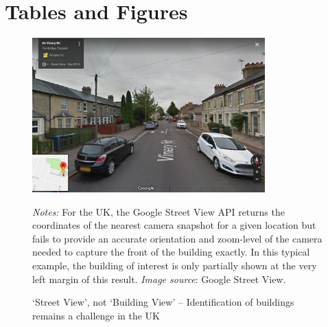 \documentclass[]{article}
\begin{document}
\newpage
\clearpage

\hypertarget{tables-and-figures}{%
\section{Tables and Figures}\label{tables-and-figures}}

\begin{figure}[hbt]
  \caption{`Street View', not `Building View' -- Identification of buildings remains a challenge in the UK}
  \centering
  \vspace{0.25cm}
    \includegraphics[width=0.8\textwidth]{figures/84VineryRD.png}
  \label{fig:84Vin}
\begin{minipage}{0.8\textwidth}
\footnotesize 
\vspace{0.25cm}
\emph{Notes:} For the UK, the Google Street View API returns the coordinates of the nearest camera snapshot for a given location but fails to provide an accurate orientation and zoom-level of the camera needed to capture the front of the building exactly. In this typical example, the building of interest is only partially shown at the very left margin of this result.  \emph{Image source}: Google Street View. 
\end{minipage}
\end{figure}

\newpage
\end{document}
